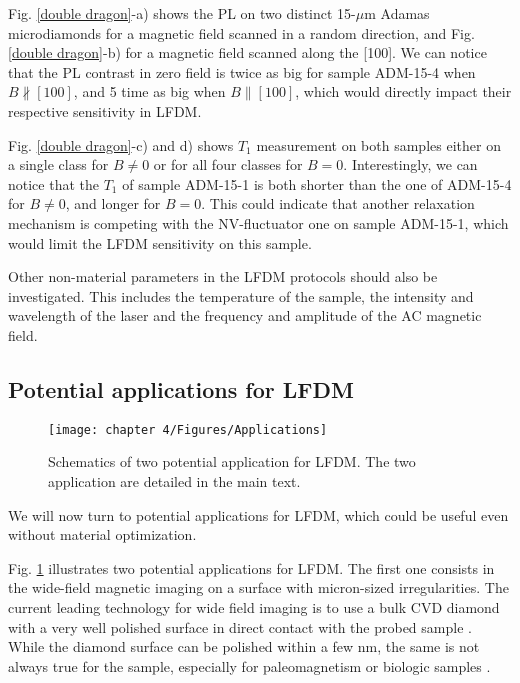 \documentclass[a4paper, 11pt]{report}
\begin{document}
Fig. \ref{double dragon}-a) shows the PL on two distinct 15-$\mu$m Adamas microdiamonds for a magnetic field scanned in a random direction, and Fig. \ref{double dragon}-b) for a magnetic field scanned along the [100]. We can notice that the PL contrast in zero field is twice as big for sample ADM-15-4 when $B \nparallel [100]$, and 5 time as big when $B \parallel [100]$, which would directly impact their respective sensitivity in LFDM.

Fig. \ref{double dragon}-c) and d) shows $T_1$ measurement on both samples either on a single class for $B\neq 0$ or for all four classes for $B=0$. Interestingly, we can notice that the $T_1$ of sample ADM-15-1 is both shorter than the one of ADM-15-4 for $B\neq 0$, and longer for $B=0$. This could indicate that another relaxation mechanism is competing with the NV-fluctuator one on sample ADM-15-1, which would limit the LFDM sensitivity on this sample.

Other non-material parameters in the LFDM protocols should also be investigated. This includes the temperature of the sample, the intensity and wavelength of the laser and the frequency and amplitude of the AC magnetic field. 

\subsection{Potential applications for LFDM}

\begin{figure}[h!]
\centering
\texttt{[image: chapter 4/Figures/Applications]}
\caption{Schematics of two potential application for LFDM. The two application are detailed in the main text.}
\label{applications}
\end{figure}

We will now turn to potential applications for LFDM, which could be useful even without material optimization.

Fig. \ref{applications} illustrates two potential applications for LFDM. The first one consists in the wide-field magnetic imaging on a surface with micron-sized irregularities. The current leading technology for wide field imaging is to use a bulk CVD diamond with a very well polished surface in direct contact with the probed sample \citep{levine2019principles, scholten2021widefield}. While the diamond surface can be polished within a few nm, the same is not always true for the sample, especially for paleomagnetism or biologic samples \citep{scholten2021widefield}. 
\end{document}
